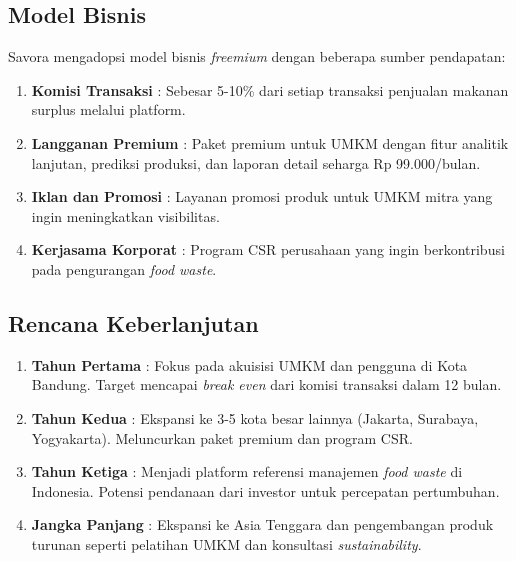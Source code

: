 \subsection{Model Bisnis}

Savora mengadopsi model bisnis \textit{freemium} dengan beberapa sumber pendapatan:

\begin{enumerate}[leftmargin=*]
    \item \textbf{Komisi Transaksi} : Sebesar 5-10\% dari setiap transaksi penjualan makanan surplus melalui platform.
    \item \textbf{Langganan Premium} : Paket premium untuk UMKM dengan fitur analitik lanjutan, prediksi produksi, dan laporan detail seharga Rp 99.000/bulan.
    \item \textbf{Iklan dan Promosi} : Layanan promosi produk untuk UMKM mitra yang ingin meningkatkan visibilitas.
    \item \textbf{Kerjasama Korporat} : Program CSR perusahaan yang ingin berkontribusi pada pengurangan \textit{food waste}.
\end{enumerate}

\subsection{Rencana Keberlanjutan}

\begin{enumerate}[leftmargin=*]
    \item \textbf{Tahun Pertama} : Fokus pada akuisisi UMKM dan pengguna di Kota Bandung. Target mencapai \textit{break even} dari komisi transaksi dalam 12 bulan.
    
    \item \textbf{Tahun Kedua} : Ekspansi ke 3-5 kota besar lainnya (Jakarta, Surabaya, Yogyakarta). Meluncurkan paket premium dan program CSR.
    
    \item \textbf{Tahun Ketiga} : Menjadi platform referensi manajemen \textit{food waste} di Indonesia. Potensi pendanaan dari investor untuk percepatan pertumbuhan.
    
    \item \textbf{Jangka Panjang} : Ekspansi ke Asia Tenggara dan pengembangan produk turunan seperti pelatihan UMKM dan konsultasi \textit{sustainability}.
\end{enumerate}
